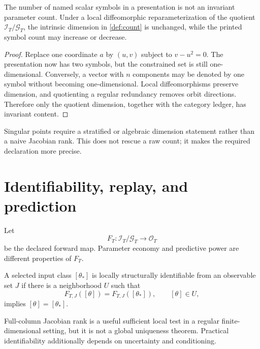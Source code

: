 \documentclass[11pt]{article}
\newcommand{\Inputs}{\mathcal I}
\newcommand{\Outputs}{\mathcal O}
\newcommand{\Redundancy}{\mathcal G}
\begin{document}
\begin{proposition}
\label{prop:symbol-count}
The number of named scalar symbols in a presentation is not an invariant
parameter count. Under a local diffeomorphic reparameterization of the
quotient \(\Inputs_T/\Redundancy_T\), the intrinsic dimension in
\cref{def:count} is unchanged, while the printed symbol count may increase
or decrease.
\end{proposition}

\begin{proof}
Replace one coordinate \(a\) by \((u,v)\) subject to \(v-u^2=0\). The
presentation now has two symbols, but the constrained set is still
one-dimensional. Conversely, a vector with \(n\) components may be denoted by
one symbol without becoming one-dimensional. Local diffeomorphisms preserve
dimension, and quotienting a regular redundancy removes orbit directions.
Therefore only the quotient dimension, together with the category ledger,
has invariant content.
\end{proof}

\begin{remark}
Singular points require a stratified or algebraic dimension statement rather
than a naive Jacobian rank. This does not rescue a raw count; it makes the
required declaration more precise.
\end{remark}

\section{Identifiability, replay, and prediction}

Let
\[
F_T:\Inputs_T/\Redundancy_T\longrightarrow \Outputs_T
\]
be the declared forward map. Parameter economy and predictive power are
different properties of \(F_T\).

\begin{definition}
A selected input class \([\theta_\ast]\) is locally structurally identifiable
from an observable set \(J\) if there is a neighborhood \(U\) such that
\[
F_{T,J}([\theta])=F_{T,J}([\theta_\ast]),\qquad [\theta]\in U,
\]
implies \([\theta]=[\theta_\ast]\).
\end{definition}

Full-column Jacobian rank is a useful sufficient local test in a regular
finite-dimensional setting, but it is not a global uniqueness theorem.
Practical identifiability additionally depends on uncertainty and
conditioning.
\end{document}
